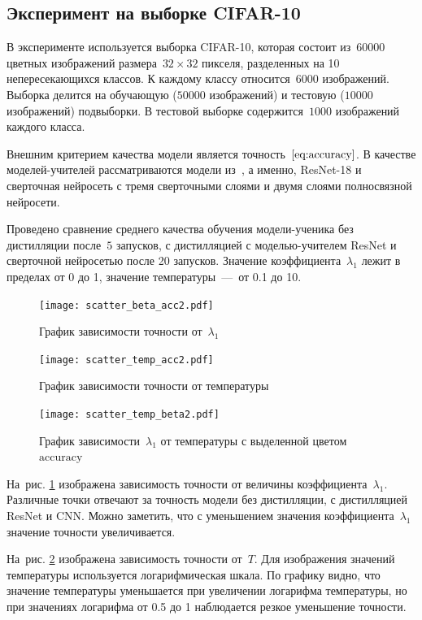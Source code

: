 \documentclass[12pt, twoside]{article}
\begin{document}
\subsection{Эксперимент на выборке CIFAR-10}
В эксперименте используется выборка CIFAR-10, которая состоит из~$60000$ цветных изображений размера~$32 \times 32$ пикселя, разделенных на 10 непересекающихся классов. К каждому классу относится~$6000$ изображений. Выборка делится на обучающую ($50000$ изображений) и тестовую ($10000$ изображений) подвыборки. В тестовой выборке содержится~$1000$ изображений каждого класса.

Внешним критерием качества модели является точность~$\eqref{eq:accuracy}$. В качестве моделей-учителей рассматриваются модели из~\cite{conf/cvpr/PassalisTT20}, а именно, ResNet-18 и сверточная нейросеть с тремя сверточными слоями и двумя слоями полносвязной нейросети.

Проведено сравнение среднего качества обучения модели-ученика без дистилляции после~$5$ запусков, с дистилляцией с моделью-учителем ResNet и сверточной нейросетью после 20 запусков. Значение коэффициента~$\lambda_1$ лежит в пределах от 0 до 1, значение температуры~---~от 0.1 до 10.

\begin{figure}[!ht]
\centering
\texttt{[image: scatter\_beta\_acc2.pdf]}
\caption{График зависимости точности от~$\lambda_1$}
\label{fig:beta_acc}
\end{figure}

\begin{figure}[!ht]
\centering
\texttt{[image: scatter\_temp\_acc2.pdf]}
\caption{График зависимости точности от температуры}
\label{fig:temp_acc}
\end{figure}

\begin{figure}[!ht]
\centering
\texttt{[image: scatter\_temp\_beta2.pdf]}
\caption{График зависимости~$\lambda_1$ от температуры с выделенной цветом~$\text{accuracy}$}
\label{fig:temp_beta}
\end{figure}

На~рис. \ref{fig:beta_acc} изображена зависимость точности от величины коэффициента~$\lambda_1$. Различные точки отвечают за точность модели без дистилляции, с дистилляцией ResNet и CNN. Можно заметить, что с уменьшением значения коэффициента~$\lambda_1$ значение точности увеличивается.

На~рис. \ref{fig:temp_acc} изображена зависимость точности от~$T$. Для изображения значений температуры используется логарифмическая шкала. По графику видно, что значение температуры уменьшается при увеличении логарифма температуры, но при значениях логарифма от 0.5 до 1 наблюдается резкое уменьшение точности.
\end{document}
